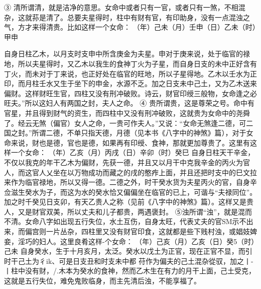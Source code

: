 ③	清所谓清，就是洁净的意思。女命中或者只有一官，或者只有一煞，不相混杂，这就荪是清了。总要夫星得时，柱中有财有官，有印助身，没有一点混浊之气，方才来得清贵。比如这样一个女命：
（年）己未（月）壬申（日）乙未（时）甲申

自身日柱乙木，以月支时支申中所含庚金为夫星。申对于庚来说，处于临官的禄地，所以夫星得时，又乙木以我生的食神丁火为子星，而自身日支的未中正好含有丁火，而未对于丁来说，也正好处在临官的旺地，所以子星得地。乙木以壬水为正印，而月柱壬水又生于坐下的申金，水源不乏。加之日支未中己土，又为乙木送来偏财。这样财旺生官，四柱又没有刑冲破败。诗云，财官印绶三般物，女命逢之必旺夫。”所以这妇人有两国之封，夫人之命。
④	贵所谓贵，这是尊荣之号。命中有官星，并且得到财气的资生，而四柱中又没有刑冲破败，这就贵为女命中的尧舜了。经云无煞（偏官）女人之命，一贵可作夫人。”又说：“女命无煞逢二德，可二国之封。”所谓二德，不单只指天德，月德（见本书《八字中的神煞》篇），对于女命来说，财也是德，官也是德，如果再有印绶、食神，那就更加尊贵了。这里有这样一个女命：
（年）乙亥（月）丙戌（日）辛卯（时）癸巳
自身日柱天干辛金，不仅以我克的年干乙木为偏财，先获一德，并且又以月干中克我辛金的丙火为官人，而这官人乂坐在以万物成功而藏之的戌的憨痄上面，并且还把时支中的巳文拉来作为临官禄地，所以又得一德。二德之外，时干癸水货为夫星丙火的官，自身辛佥滋生癸水为子，而这为水的癸水恰又偏偏坐在临官的已上，可谐与“夫禄同位”。加之时千癸见日支卯，有天乙贵人之称（见前《八字中的神煞》篇）。这样又是贵人，又是财官双美，所以丈夫和儿子都贵，两遇褒封。
⑤浊所谓“浊”，就是混而不清。女命八字如出现五行失位，水土互伤，自身太旺，代表丈夫的官SM示不出来，而偏宫则一片丛杂，四柱里又没有财官印食，这就都是些下贱村浊，或娼妓婢妾，淫巧的妇人。这里良肴这样-个女命：
（年）己亥（月）乙亥（日）癸5（时）己未
自身癸水，生于十月亥月，太泛。癸水以戊土为正官，现在正官不显，而引时干己土为彳ik、可是日支丑和时支未中都
苻作为偏夫的己土混杂從驭，加之丨-丨柱中没有财，/.木本为癸水的食神，然而乙木生在有力的月干上面，己土受克，这就是五行失位，难免鬼败临身，而主先清后浊，不能享福了。

